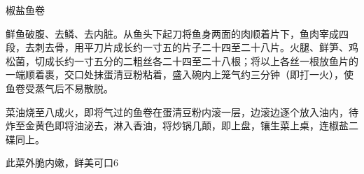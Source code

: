 \begin{recipe}{椒盐鱼卷}

\ingredients


\cooking

\step 鲜鱼破腹、去鳞、去内脏。从鱼头下起刀将鱼身两面的肉顺着片下，鱼肉宰成四段，去刺去骨，用平刀片成长约一寸五的片子二十四至二十八片。火腿、鲜笋、鸡松菌，切成长约一寸五分的二粗丝各二十四至二十八根；将以上各丝一根放鱼片的一端顺着裹，交口处抹蛋清豆粉粘着，盛入碗内上笼气约三分钟（即打一火），使鱼卷受蒸气后不易散脱。

\step 菜油烧至八成火，即将气过的鱼卷在蛋清豆粉内滚一层，边滚边逐个放入油内，待炸至金黄色即将油泌去，淋入香油，将炒锅几颠，即上盘，镶生菜上桌，连椒盐二碟同上。

\notes

此菜外脆内嫩，鲜美可口6

\end{recipe}

